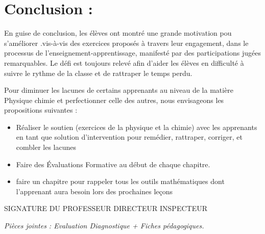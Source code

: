 \documentclass[12pt]{article}
\begin{document}
\section*{Conclusion : }
\hspace{2cm}En guise de conclusion, les élèves ont  montré  une grande motivation  pou s’améliorer .vis-à-vis des exercices proposés à travers leur engagement, dans le processus de l’enseignement-apprentissage, manifesté par des participations jugées remarquables. Le défi est toujours relevé afin d’aider les élèves en difficulté à suivre le rythme de la classe et de rattraper le temps perdu.

 Pour diminuer les lacunes de certains apprenants au niveau de la matière Physique chimie et perfectionner celle des autres, nous envisageons les propositions suivantes : 
 \begin{itemize}
	 \item Réaliser le soutien (exercices de la physique et la chimie) avec les apprenants en tant que solution d’intervention pour remédier, rattraper, corriger, et combler les lacunes
	 \item Faire des Évaluations Formative au début de chaque chapitre.
	 \item faire un chapitre pour rappeler tous les outils mathématiques dont l’apprenant aura besoin lors des prochaines leçons 

 \end{itemize}

 SIGNATURE DU PROFESSEUR \hspace{3cm} DIRECTEUR  \hspace{3cm} INSPECTEUR

 \vspace{3.85cm}
\emph{Pièces jointes : Evaluation Diagnostique + Fiches pédagogiques.}
\end{document}
